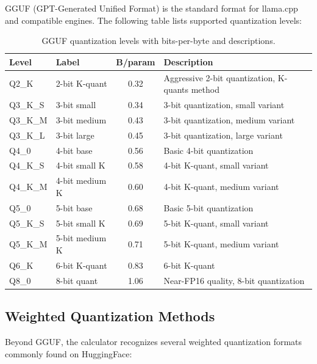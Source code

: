 \documentclass[11pt,a4paper]{article}
\theoremstyle{definition}
\begin{document}
GGUF (GPT-Generated Unified Format) is the standard format for llama.cpp and compatible engines. The following table lists supported quantization levels:

\begin{table}[htbp]
\centering
\caption{GGUF quantization levels with bits-per-byte and descriptions.}\label{tab:gguf}
\begin{tabularx}{0.9\textwidth}{llcX}
\toprule
\textbf{Level} & \textbf{Label} & \textbf{B/param} & \textbf{Description} \\
\midrule
Q2\_K & 2-bit K-quant & 0.32 & Aggressive 2-bit quantization, K-quants method \\
Q3\_K\_S & 3-bit small & 0.34 & 3-bit quantization, small variant \\
Q3\_K\_M & 3-bit medium & 0.43 & 3-bit quantization, medium variant \\
Q3\_K\_L & 3-bit large & 0.45 & 3-bit quantization, large variant \\
Q4\_0 & 4-bit base & 0.56 & Basic 4-bit quantization \\
Q4\_K\_S & 4-bit small K & 0.58 & 4-bit K-quant, small variant \\
Q4\_K\_M & 4-bit medium K & 0.60 & 4-bit K-quant, medium variant \\
Q5\_0 & 5-bit base & 0.68 & Basic 5-bit quantization \\
Q5\_K\_S & 5-bit small K & 0.69 & 5-bit K-quant, small variant \\
Q5\_K\_M & 5-bit medium K & 0.71 & 5-bit K-quant, medium variant \\
Q6\_K & 6-bit K-quant & 0.83 & 6-bit K-quant \\
Q8\_0 & 8-bit quant & 1.06 & Near-FP16 quality, 8-bit quantization \\
\bottomrule
\end{tabularx}
\end{table}

\subsection{Weighted Quantization Methods}

Beyond GGUF, the calculator recognizes several weighted quantization formats commonly found on HuggingFace:
\end{document}
